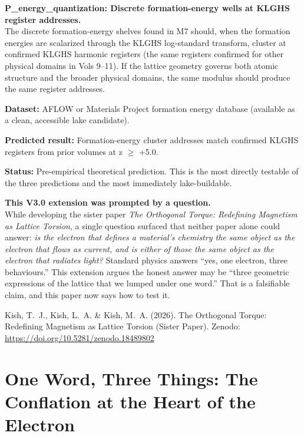 \documentclass[11pt, letterpaper, openany]{book}
\begin{document}
\begin{predictionbox}
\textbf{P\_energy\_quantization: Discrete formation-energy wells
at KLGHS register addresses.}\\[0.5em]
The discrete formation-energy shelves found in M7 should, when
the formation energies are scalarized through the KLGHS
log-standard transform, cluster at confirmed KLGHS harmonic
registers (the same registers confirmed for other physical domains
in Vols 9--11). If the lattice geometry governs both atomic
structure and the broader physical domains, the same modulus
should produce the same register addresses.

\textbf{Dataset:} AFLOW or Materials Project formation energy
database (available as a clean, accessible lake candidate).

\textbf{Predicted result:} Formation-energy cluster addresses
match confirmed KLGHS registers from prior volumes at z $\geq$
+5.0.

\textbf{Status:} Pre-empirical theoretical prediction. This is
the most directly testable of the three predictions and the most
immediately lake-buildable.
\end{predictionbox}

\clearpage

\begin{bridgebox}
\textbf{This V3.0 extension was prompted by a question.}\\[0.4em]
While developing the sister paper \emph{The Orthogonal Torque: Redefining
Magnetism as Lattice Torsion}, a single question surfaced that neither
paper alone could answer: \emph{is the electron that defines a material's
chemistry the same object as the electron that flows as current, and is
either of those the same object as the electron that radiates light?}
Standard physics answers ``yes, one electron, three behaviours.'' This
extension argues the honest answer may be ``three geometric expressions
of the lattice that we lumped under one word.'' That is a falsifiable
claim, and this paper now says how to test it.

Kish, T.~J., Kish, L.~A. \& Kish, M.~A. (2026).
The Orthogonal Torque: Redefining Magnetism as Lattice Torsion (Sister Paper). 
Zenodo:
\url{https://doi.org/10.5281/zenodo.18489802}
\end{bridgebox}
 
\chapter{One Word, Three Things: The Conflation at the Heart of the Electron}
 
\end{document}

